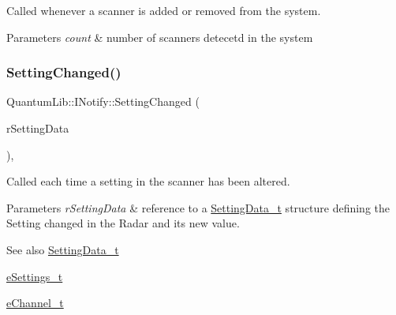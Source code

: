 Called whenever a scanner is added or removed from the system. 
\begin{DoxyParams}{Parameters}
{\em count} & number of scanners detecetd in the system \\
\hline
\end{DoxyParams}
\mbox{\label{class_quantum_lib_1_1_i_notify_aa7224861ce088af10d5b471d9550bb21}} 
\subsubsection{\texorpdfstring{Setting\+Changed()}{SettingChanged()}}
{\footnotesize\ttfamily Quantum\+Lib\+::\+I\+Notify\+::\+Setting\+Changed (\begin{DoxyParamCaption}\item[{\mbox{\hyperlink{struct_quantum_lib_1_1_setting_data__t}{Quantum\+Lib\+::\+Setting\+Data\+\_\+t}} \&}]{r\+Setting\+Data }\end{DoxyParamCaption})\hspace{0.3cm}{\ttfamily [inline]}, {\ttfamily [virtual]}}

Called each time a setting in the scanner has been altered. 
\begin{DoxyParams}{Parameters}
{\em r\+Setting\+Data} & reference to a \mbox{\hyperlink{struct_quantum_lib_1_1_setting_data__t}{Setting\+Data\+\_\+t}} structure defining the Setting changed in the Radar and its new value. \\
\hline
\end{DoxyParams}
\begin{DoxySeeAlso}{See also}
\mbox{\hyperlink{struct_quantum_lib_1_1_setting_data__t}{Setting\+Data\+\_\+t}} 

\mbox{\hyperlink{namespace_quantum_lib_acc8124e3e65bca4aa798d03a55e3d54c}{e\+Settings\+\_\+t}} 

\mbox{\hyperlink{namespace_quantum_lib_ad62fc36ad3cd7ee810cbfc545d04ea9c}{e\+Channel\+\_\+t}} 
\end{DoxySeeAlso}
\mbox{\label{class_quantum_lib_1_1_i_notify_a5e4b6945d8009cc8f820353237ef489c}} 
